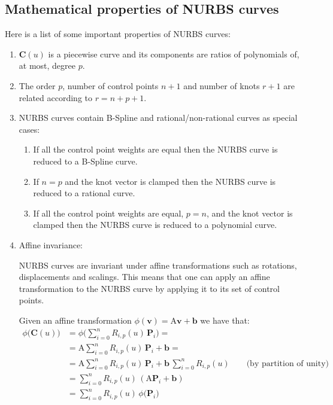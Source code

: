 \subsection{Mathematical properties of NURBS curves}
Here is a list of some important properties of NURBS curves:

\begin{enumerate}

    \item $\mathbf{C}(u)$ is a piecewise curve and its components are ratios of polynomials of, at most, degree $p$.
    
    \item The order $p$, number of control points $n+1$ and number of knots $r+1$ are related according to $r = n + p + 1$.
    
    \item NURBS curves contain B-Spline and rational/non-rational \Bezier curves as special cases:
    \begin{enumerate}
        \item If all the control point weights are equal then the NURBS curve is reduced to a B-Spline curve.
        \item If $n = p$ and the knot vector is clamped then the NURBS curve is reduced to a rational \Bezier curve.
        \item If all the control point weights are equal, $p = n$, and the knot vector is clamped then the NURBS curve is reduced to a polynomial \Bezier curve.
    \end{enumerate}

    \item Affine invariance:
    
    NURBS curves are invariant under affine transformations such as rotations, displacements and scalings. This means that one can apply an affine transformation to the NURBS curve by applying it to its set of control points.
    
    Given an affine transformation $\phi(\mathbf{v}) = \mathrm{A} \mathbf{v} + \mathbf{b}$ we have that:
    \begin{align*}
        \phi \big(\mathbf{C}(u)\big) &= \phi \big(\sum_{i=0}^{n} R_{i,p}(u)\, \mathbf{P}_{i}\big) = \\
        &= \mathrm{A} \sum_{i=0}^{n} R_{i,p}(u)\, \mathbf{P}_{i} + \mathbf{b} = \\
        &= \mathrm{A} \sum_{i=0}^{n} R_{i,p}(u)\, \mathbf{P}_{i} + \mathbf{b} \, \sum_{i=0}^{n} R_{i,p}(u) \qquad \text{(by partition of unity)}\\
        &= \sum_{i=0}^{n} R_{i,p}(u)\,( \mathrm{A} \mathbf{P}_{i} + \mathbf{b}) \\
        &= \sum_{i=0}^{n} R_{i,p}(u)\,\phi \big(\mathbf{P}_{i} \big)
    \end{align*}
    

\end{enumerate}
